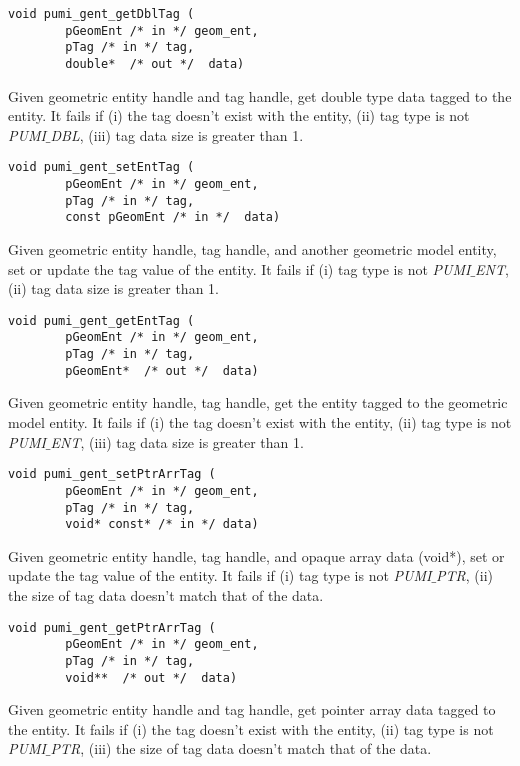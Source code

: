 \begin{verbatim}
void pumi_gent_getDblTag (
        pGeomEnt /* in */ geom_ent, 
        pTag /* in */ tag,
        double*  /* out */  data)
\end{verbatim}\vspace{-.5cm}\hspace{1cm}
        Given geometric entity handle and tag handle, get double type data tagged to the entity. It fails if (i) the tag doesn't exist with the entity, (ii) tag type is not \emph{PUMI}$\_$\emph{DBL}, (iii) tag data size is greater than 1.

\begin{verbatim}
void pumi_gent_setEntTag (
        pGeomEnt /* in */ geom_ent, 
        pTag /* in */ tag,
        const pGeomEnt /* in */  data)
\end{verbatim}\vspace{-.5cm}\hspace{1cm}
        Given geometric entity handle, tag handle, and another geometric model entity, set or update the tag value of the entity. It fails if (i) tag type is not  \emph{PUMI}$\_$\emph{ENT}, (ii) tag data size is greater than 1.

\begin{verbatim}
void pumi_gent_getEntTag (
        pGeomEnt /* in */ geom_ent, 
        pTag /* in */ tag,
        pGeomEnt*  /* out */  data)
\end{verbatim}\vspace{-.5cm}\hspace{1cm}
        Given geometric entity handle, tag handle, get the entity tagged to the geometric model entity. It fails if (i) the tag doesn't exist with the entity, (ii) tag type is not \emph{PUMI}$\_$\emph{ENT}, (iii) tag data size is greater than 1.

\begin{verbatim}
void pumi_gent_setPtrArrTag (
        pGeomEnt /* in */ geom_ent, 
        pTag /* in */ tag,
        void* const* /* in */ data)
\end{verbatim}\vspace{-.5cm}\hspace{1cm}
        Given geometric entity handle, tag handle, and opaque array data (void*), set or update the tag value of the entity.  It fails if (i) tag type is not \emph{PUMI}$\_$\emph{PTR}, (ii) the size of tag data doesn't match that of the data.

\begin{verbatim}
void pumi_gent_getPtrArrTag (
        pGeomEnt /* in */ geom_ent, 
        pTag /* in */ tag,
        void**  /* out */  data)
\end{verbatim}\vspace{-.5cm}\hspace{1cm}
        Given geometric entity handle and tag handle, get pointer array data tagged to the entity. It fails if (i) the tag doesn't exist with the entity, (ii) tag type is not \emph{PUMI}$\_$\emph{PTR}, (iii) the size of tag data doesn't match that of the data.

